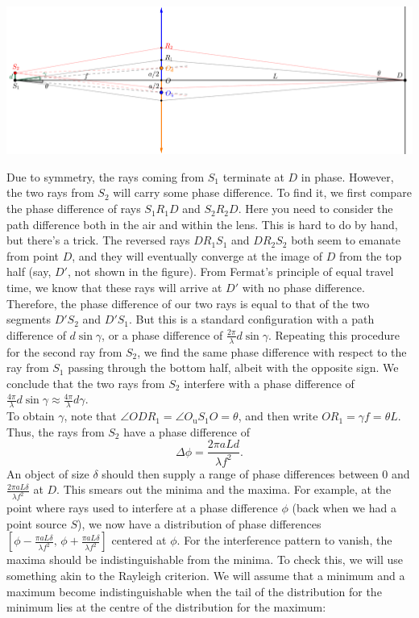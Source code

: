 \documentclass[../TST.tex]{subfiles}
\begin{document}
\begin{solution}
\begin{center}
\includegraphics[width=1\textwidth]{fig/a2009_s63.pdf}
\end{center}

Due to symmetry, the rays coming from $S_1$ terminate at $D$ in phase. However, the two rays from $S_2$ will carry some phase difference. To find it, we first compare the phase difference of rays $S_1R_1D$ and $S_2R_2D$. Here you need to consider the path difference both in the air and within the lens. This is hard to do by hand, but there's a trick. The reversed rays $DR_1S_1$ and $DR_2S_2$ both seem to emanate from point $D$, and they will eventually converge at the image of $D$ from the top half (say, $D'$, not shown in the figure). From Fermat's principle of equal travel time, we know that these rays will arrive at $D'$ with no phase difference. Therefore, the phase difference of our two rays is equal to that of the two segments $D'S_2$ and $D'S_1$. But this is a standard configuration with a path difference of $d\sin{\gamma}$, or a phase difference of $\frac{2\pi}{\lambda}d\sin{\gamma}$. Repeating this procedure for the second ray from $S_2$, we find the same phase difference with respect to the ray from $S_1$ passing through the bottom half, albeit with the opposite sign. We conclude that the two rays from $S_2$ interfere with a phase difference of $\frac{4\pi}{\lambda}d\sin{\gamma}\approx\frac{4\pi}{\lambda}d{\gamma}$.\\[5pt]
To obtain $\gamma$, note that $\angle ODR_1=\angle O_\mathrm{u}S_1O=\theta$, and then write $OR_1=\gamma f=\theta L$. Thus, the rays from $S_2$ have a phase difference of 
\begin{equation*}
\Delta\phi=\frac{2\pi aLd}{\lambda f^2}
.
\end{equation*}
An object of size $\delta$ should then supply a range of phase differences between $0$ and $\frac{2\pi aL\delta}{\lambda f^2}$ at $D$. This smears out the minima and the maxima. For example, at the point where rays used to interfere at a phase difference $\phi$ (back when we had a point source $S$), we now have a distribution of phase differences $\left[\phi-\frac{\pi a L \delta}{\lambda f^2},\,\phi+\frac{\pi a L \delta }{\lambda f^2} \right]$ centered at $\phi$. For the interference pattern to vanish, the maxima should be indistinguishable from the minima. To check this, we will use something akin to the Rayleigh criterion. We will assume that a minimum and a maximum become indistinguishable when the tail of the distribution for the minimum lies at the centre of the distribution for the maximum:\\


\end{solution}
\end{document}
